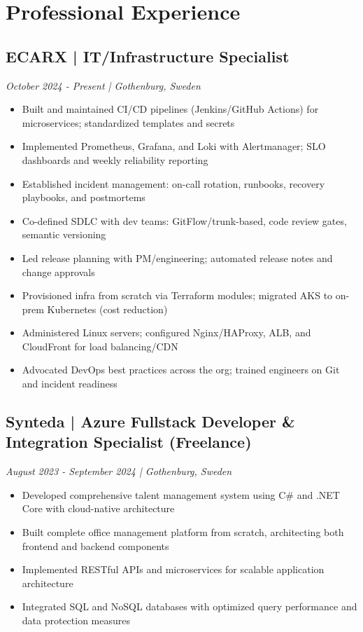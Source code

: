 \documentclass[11pt,a4paper]{article}
\begin{document}
\section*{Professional Experience}

\subsection*{ECARX | IT/Infrastructure Specialist}
\textit{October 2024 - Present | Gothenburg, Sweden}
\begin{itemize}[noitemsep]
\item Built and maintained CI/CD pipelines (Jenkins/GitHub Actions) for microservices; standardized templates and secrets
\item Implemented Prometheus, Grafana, and Loki with Alertmanager; SLO dashboards and weekly reliability reporting
\item Established incident management: on-call rotation, runbooks, recovery playbooks, and postmortems
\item Co-defined SDLC with dev teams: GitFlow/trunk-based, code review gates, semantic versioning
\item Led release planning with PM/engineering; automated release notes and change approvals
\item Provisioned infra from scratch via Terraform modules; migrated AKS to on-prem Kubernetes (cost reduction)
\item Administered Linux servers; configured Nginx/HAProxy, ALB, and CloudFront for load balancing/CDN
\item Advocated DevOps best practices across the org; trained engineers on Git and incident readiness\end{itemize}

\subsection*{Synteda | Azure Fullstack Developer \& Integration Specialist (Freelance)}
\textit{August 2023 - September 2024 | Gothenburg, Sweden}
\begin{itemize}[noitemsep]
\item Developed comprehensive talent management system using C\# and .NET Core with cloud-native architecture
\item Built complete office management platform from scratch, architecting both frontend and backend components
\item Implemented RESTful APIs and microservices for scalable application architecture
\item Integrated SQL and NoSQL databases with optimized query performance and data protection measures
\end{itemize}
\end{document}
